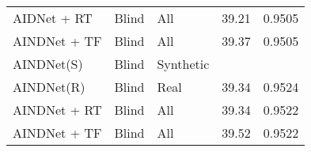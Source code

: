 \documentclass[10pt,twocolumn,letterpaper]{article}
\begin{document}
\begin{table}[t]
\begin{adjustbox}{width=0.94\linewidth}
\begin{tabular}{lllll}
			AIDNet + RT			& Blind 	 & All  & 39.21  	  & 0.9505		\\
			AINDNet + TF 		& Blind 	 & All  & 39.37  	  & 0.9505 		\\
			\midrule
			AINDNet(S) 	    	 & Blind 	 & Synthetic  & \color{red}{39.77}  	  & \color{red}{0.9590} \\
			AINDNet(R)     	 & Blind 	 & Real  & 39.34  	  & 0.9524 \\
			AINDNet + RT 			 & Blind 	 & All  & 39.34  	  & 0.9522 \\
			AINDNet + TF 	    	 & Blind 	 & All  & 39.52  	  & 0.9522 \\
			\bottomrule					
		\end{tabular}
	\end{adjustbox}
\end{table}
\end{document}
